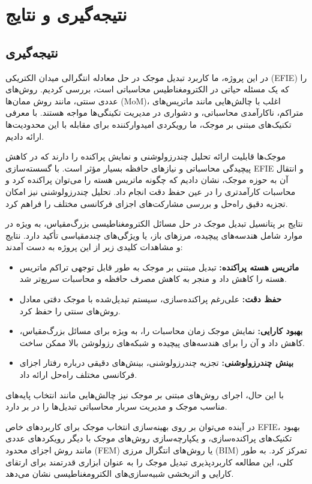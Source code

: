 \documentclass[12pt,a4paper]{article}
\begin{document}
\newpage

\section{نتیجه‌گیری و نتایج}
\subsection{نتیجه‌گیری}
در این پروژه، ما کاربرد تبدیل موجک در حل معادله انتگرالی میدان الکتریکی (EFIE) را که یک مسئله حیاتی در الکترومغناطیس محاسباتی است، بررسی کردیم. روش‌های عددی سنتی، مانند روش ممان‌ها (MoM)، اغلب با چالش‌هایی مانند ماتریس‌های متراکم، ناکارآمدی محاسباتی، و دشواری در مدیریت تکینگی‌ها مواجه هستند. با معرفی تکنیک‌های مبتنی بر موجک، ما رویکردی امیدوارکننده برای مقابله با این محدودیت‌ها ارائه دادیم.

موجک‌ها قابلیت ارائه تحلیل چندرزولوشنی و نمایش پراکنده را دارند که در کاهش پیچیدگی محاسباتی و نیازهای حافظه بسیار مؤثر است. با گسسته‌سازی EFIE و انتقال آن به حوزه موجک، نشان دادیم که چگونه ماتریس هسته را می‌توان پراکنده کرد و محاسبات کارآمدتری را در عین حفظ دقت انجام داد. تحلیل چندرزولوشنی نیز امکان تجزیه دقیق راه‌حل و بررسی مشارکت‌های اجزای فرکانسی مختلف را فراهم کرد.

نتایج بر پتانسیل تبدیل موجک در حل مسائل الکترومغناطیسی بزرگ‌مقیاس، به ویژه در موارد شامل هندسه‌های پیچیده، مرزهای باز، یا ویژگی‌های چندمقیاسی تأکید دارد. نتایج و مشاهدات کلیدی زیر از این پروژه به دست آمدند\cite{Code}:

\begin{itemize}
    \item \textbf{ماتریس هسته پراکنده:} تبدیل مبتنی بر موجک به طور قابل توجهی تراکم ماتریس هسته را کاهش داد و منجر به کاهش مصرف حافظه و محاسبات سریع‌تر شد.
    \item \textbf{حفظ دقت:} علی‌رغم پراکنده‌سازی، سیستم تبدیل‌شده با موجک دقتی معادل روش‌های سنتی را حفظ کرد.
    \item \textbf{بهبود کارایی:} نمایش موجک زمان محاسبات را، به ویژه برای مسائل بزرگ‌مقیاس، کاهش داد و آن را برای هندسه‌های پیچیده و شبکه‌های رزولوشن بالا ممکن ساخت.
    \item \textbf{بینش چندرزولوشنی:} تجزیه چندرزولوشنی، بینش‌های دقیقی درباره رفتار اجزای فرکانسی مختلف راه‌حل ارائه داد.
\end{itemize}

با این حال، اجرای روش‌های مبتنی بر موجک نیز چالش‌هایی مانند انتخاب پایه‌های مناسب موجک و مدیریت سربار محاسباتی تبدیل‌ها را در بر دارد.

در آینده می‌توان بر روی بهینه‌سازی انتخاب موجک برای کاربردهای خاص EFIE، بهبود تکنیک‌های پراکنده‌سازی، و یکپارچه‌سازی روش‌های موجک با دیگر رویکردهای عددی مانند روش اجزای محدود (FEM) یا روش‌های انتگرال مرزی (BIM) تمرکز کرد. به طور کلی، این مطالعه کاربردپذیری تبدیل موجک را به عنوان ابزاری قدرتمند برای ارتقای کارایی و اثربخشی شبیه‌سازی‌های الکترومغناطیسی نشان می‌دهد.
\end{document}
